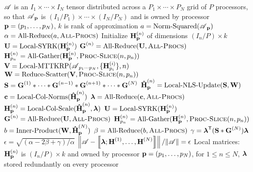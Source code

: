\begin{algorithm}
\caption{$\lt[\Mn{H}{1},\dots,\Mn{H}{N}\rt] = \text{Par-NNCP-ALS}(\TA,k)$}
\label{alg:2D}
\begin{algorithmic}[1]
\Require $\TA$ is an $I_1\times \cdots \times I_N$ tensor distributed across a $P_1\times \cdots \times P_N$ grid of $P$ processors, so that $\TA_{\V{p}}$ is $(I_1/P_1)\times \cdots \times (I_N/P_N)$ and is owned by processor $\V{p}=(p_1,\dots,p_N)$, $k$ is rank of approximation
\State {}
\State $a = \text{Norm-Squared}(\TA_{\V{p}})$
\State $\alpha = \text{All-Reduce}(a,\textsc{All-Procs})$
	\State Initialize $\Mn{H}{n}_{\V{p}}$ of dimensions $(I_n/P)\times k$ 
	\State $\M{U} = \text{Local-SYRK}(\Mn{H}{n}_{\V{p}})$
	\State $\Mn{G}{n} = \text{All-Reduce}(\M{U},\textsc{All-Procs})$
	\State $\Mn{H}{n}_{p_n} = \text{All-Gather}(\Mn{H}{n}_{\V{p}},\textsc{Proc-Slice}(n,\VE{p}{n}))$
\EndFor
\State {}
	\State {}
	\State {}
	\State $\M{V} = \text{Local-MTTKRP}(\TA_{p_1\cdots p_N},\{\Mn{H}{i}_{p_i}\},n)$
		\label{line:locMTTKRP}
	\State $\M{W} = \text{Reduce-Scatter}(\M{V},\textsc{Proc-Slice}(n,\VE{p}{n}))$ 
		\label{line:reduce-scatter}
	\State $\M{S} = \Mn{G}{1} \Hada \cdots \Hada \Mn{G}{n-1} \Hada \Mn{G}{n+1} \Hada \cdots \Hada \Mn{G}{N}$
		\label{line:hadamard}
	\State $\Mn[\hat]{H}{n}_{\V{p}} = \text{Local-NLS-Update}(\M{S},\M{W})$
		\label{line:locNLS}
	\State {}
	\State $\V{c} = \text{Local-Col-Norms}(\Mn[\hat]{H}{n}_{\V{p}})$
	\State $\V{\lambda} = \text{All-Reduce}(\V{c},\textsc{All-Procs})$
	\State $\Mn{H}{n}_{\V{p}} = \text{Local-Col-Scale}(\Mn[\hat]{H}{n}_{\V{p}},\V{\lambda})$
	\State {}
	\State $\M{U} = \text{Local-SYRK}(\Mn{H}{n}_{\V{p}})$
		\label{line:locSYRK}
	\State $\Mn{G}{n} = \text{All-Reduce}(\M{U},\textsc{All-Procs})$
		\label{line:all-reduce}
	\State $\Mn{H}{n}_{p_n} = \text{All-Gather}(\Mn{H}{n}_{\V{p}},\textsc{Proc-Slice}(n,\VE{p}{n}))$
		\label{line:all-gather}
	\EndFor
	\State {}
	\State $b = \text{Inner-Product}(\M{W},\Mn[\hat]{H}{N}_{\V{p}})$
	\State $\beta = \text{All-Reduce}(b,\textsc{All-Procs})$
	\State $\gamma = \V{\lambda}^\Tra (\M{S} \Hada \Mn{G}{N}) \V{\lambda}$
	\State $\epsilon = \sqrt{(\alpha-2\beta+\gamma)/\alpha}$ 
\EndWhile
\Ensure $\lt\|\TA - \Dsquare{\V{\lambda}; \Mn{H}{1},\dots,\Mn{H}{N}}\rt\| /\|\TA\| = \epsilon$
\Ensure Local matrices: $\Mn{H}{n}_{\V{p}}$ is $(I_n/P)\times k$ and owned by processor $\V{p}=(p_1,\dots,p_N)$, for $1\leq n \leq N$, $\V{\lambda}$ stored redundantly on every processor
\end{algorithmic}
\end{algorithm}


